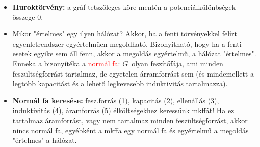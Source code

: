 \documentclass[../../szobeli.tex]{subfiles}
\begin{document}
\begin{itemize}
\begin{itemize}
            \item \textbf{Huroktörvény:} a gráf tetszőleges köre mentén a potenciálkülönbségek összege 0.
            \item Mikor "értelmes" egy ilyen hálózat? Akkor, ha a fenti törvényekkel felírt egyenletrendszer egyértelműen megoldható. Bizonyítható, hogy ha a fenti esetek egyike sem áll fenn, akkor a megoldás egyértelmű, a hálózat "értelmes". Enneka a bizonyítéka a \textcolor{red}{normál fa}: $G$ olyan feszítőfája, ami minden feszültségforrást tartalmaz, de egyetelen árramforrást sem (és mindemellett a legtöbb kapacitást és a lehető legkevesebb induktivitás tartalmazza).
            \item \textbf{Normál fa keresése:} fesz.forrás (1), kapacitás (2), ellenállás (3), induktivitás (4), áramforrás (5) élköltségekhez keressünk mkffát! Ha ez tartalmaz áramforrást, vagy nem tartalmaz minden feszültségforrást, akkor nincs normál fa, egyébként a mkffa egy normál fa és egyértelmű a megoldás "értelmes" a hálózat.
        \end{itemize}
    \end{itemize}
    
\end{document}
